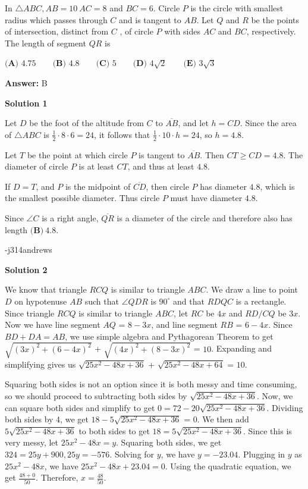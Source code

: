 \begin{enumerate}
 

In $\triangle ABC, AB = 10~ AC = 8$ and $BC = 6$. Circle $P$ is the circle with smallest radius which passes through $C$ 
and is tangent to $AB$. Let $Q$ and $R$ be the points of intersection, distinct from $C$ , of circle $P$ with sides $AC$ 
and $BC$, respectively. The length of segment $QR$ is


 $\textbf{(A) }4.75\qquad \textbf{(B) }4.8\qquad \textbf{(C) }5\qquad \textbf{(D) }4\sqrt{2}\qquad  \textbf{(E) }3\sqrt{3}$

 \textbf{Answer: }B



\textbf{Solution 1}

Let $D$ be the foot of the altitude from $C$ to $\overline{AB}$, and let $h = CD$.  Since the area of $\triangle ABC$ is $\frac{1}{2}\cdot 8\cdot 6= 24$, it follows that $\frac{1}{2}\cdot{10}\cdot{h} = 24$, so $h = 4.8$.

 Let $T$ be the point at which circle $P$ is tangent to $\overline{AB}$.  Then $CT \geq CD = 4.8$.  The diameter of circle $P$ is at least $CT$, and thus at least $4.8$.

 If $D = T$, and $P$ is the midpoint of $\overline{CD}$, then circle $P$ has diameter $4.8$, which is the smallest possible diameter.  Thus circle $P$ must have diameter $4.8$.

 Since $\angle C$ is a right angle, $\overline{QR}$ is a diameter of the circle and therefore also has length $\boxed{\textbf{(B)}\ 4.8}$.  

 -j314andrews

 



\textbf{Solution 2}

We know that triangle $RCQ$ is similar to triangle $ABC$. We draw a line to point $D$ on hypotenuse $AB$ such that $\angle QDR$ is $90 ^\circ$ and that $RDQC$ is a rectangle. Since triangle $RCQ$ is similar to triangle $ABC$, let $RC$ be $4x$ and $RD/CQ$ be $3x$. Now we have line segment $AQ$ = $8-3x$, and line segment $RB$ = $6-4x$. Since $BD + DA = AB$, we use simple algebra and Pythagorean Theorem to get $\sqrt {(3x)^2 + (6-4x)^2}$ + $\sqrt {(4x)^2 + (8-3x)^2}$ = $10$. Expanding and simplifying gives us $\sqrt {25x^2-48x+36}$ + $\sqrt {25x^2-48x+64}$ = $10$. 

 Squaring both sides is not an option since it is both messy and time consuming, so we should proceed to subtracting both sides by  $\sqrt {25x^2-48x+36}$. Now, we can square both sides and simplify to get $0 = 72 - 20 \sqrt{25x^2-48x+36}$. Dividing both sides by $4$, we get $18 - 5 \sqrt {25x^2-48x+36}$ = $0$. We then add $5 \sqrt {25x^2-48x+36}$ to both sides to get $18 = 5 \sqrt {25x^2-48x+36}$. Since this is very messy, let $25x^2 - 48x = y$. Squaring both sides, we get $324 = 25y + 900, 25y = -576$. Solving for $y$, we have $y = -23.04$. Plugging in $y$ as $25x^2-48x$, we have $25x^2-48x+23.04 = 0$. Using the quadratic equation, we get $\frac {48+0}{50}$. Therefore, $x = \frac {48}{50}$. 


\end{enumerate}

